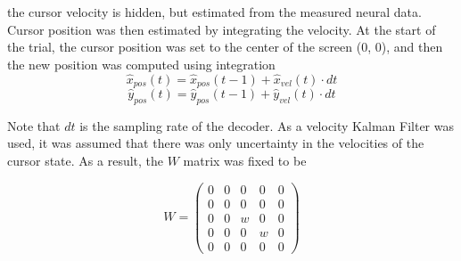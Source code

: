 \documentclass[11pt, a4paper, openany]{report}
\theoremstyle{definition}
\theoremstyle{remark}
\begin{document}
the cursor velocity is hidden, but estimated from the measured neural data. Cursor position was then estimated by integrating the velocity. At the start of the trial, the cursor position was set to the center of the screen (0, 0), and then the new position was computed using integration
\[ \hat{x}_{pos}(t) = \hat{x}_{pos}(t-1) + \hat{x}_{vel}(t) \cdot dt \]
\[ \hat{y}_{pos}(t) = \hat{y}_{pos}(t-1) + \hat{y}_{vel}(t) \cdot dt \]

Note that \( dt \) is the sampling rate of the decoder. As a velocity Kalman Filter was used, it was assumed that there was only uncertainty in the velocities of the cursor state. As a result, the \( W \) matrix was fixed to be

\[ W = \begin{pmatrix}
0 & 0 & 0 & 0 & 0\\
0 & 0 & 0 & 0 & 0\\
0 & 0 & w & 0 & 0\\
0 & 0 & 0 & w & 0\\
0 & 0 & 0 & 0 & 0
\end{pmatrix} \]
\end{document}
